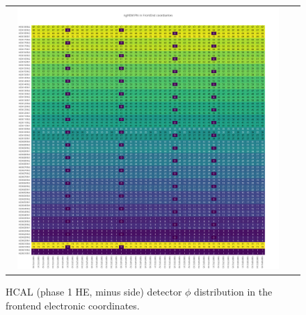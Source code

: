 \begin{figure}[htb]
 \begin{center}
  \begin{tabular}{cc}
   \includegraphics[angle=0,width=0.95\textwidth]{figures/appendix/ngHEM_Phi_in_FrontEnd.png}
  \end{tabular}
  \caption{HCAL (phase 1 HE, minus side) detector $\phi$ distribution in the frontend electronic coordinates.}
  \label{fig:lmapngHEMPhiFEC}
 \end{center}
\end{figure}
\clearpage

